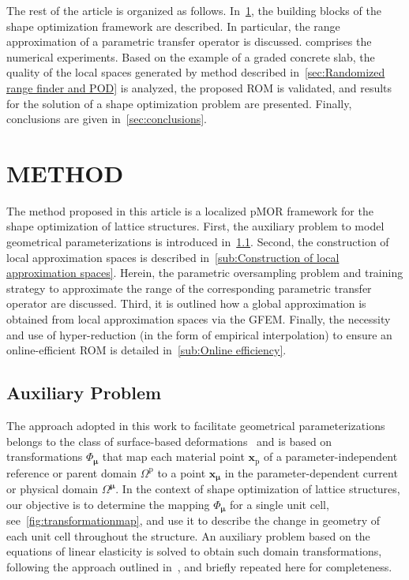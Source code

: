 \documentclass[a4paper]{eccomas_paper-2024}
\begin{document}
The rest of the article is organized as follows.
In~\cref{sec:method}, the building blocks of the shape optimization framework are described.
In particular, the range approximation of a parametric transfer operator is discussed.
 comprises the numerical experiments.
Based on the example of a graded concrete slab, the quality of the local spaces generated by method described in~\cref{sec:Randomized range finder and POD} is analyzed, the proposed ROM is validated, and results for the solution of a shape optimization problem are presented.
Finally, conclusions are given in~\cref{sec:conclusions}.


\section{METHOD}%
\label{sec:method}
The method proposed in this article is a localized pMOR framework for the shape optimization of lattice structures.
First, the auxiliary problem to model geometrical parameterizations is introduced in~\cref{sub:Auxiliary Problem}.
Second, the construction of local approximation spaces is described in~\cref{sub:Construction of local approximation spaces}.
Herein, the parametric oversampling problem and training strategy to approximate the range of the corresponding parametric transfer operator are discussed.
Third, it is outlined how a global approximation is obtained from local approximation spaces via the GFEM.
Finally, the necessity and use of hyper-reduction (in the form of empirical interpolation) to ensure an online-efficient ROM is detailed in~\cref{sub:Online efficiency}.

\subsection{Auxiliary Problem} %
\label{sub:Auxiliary Problem}
The approach adopted in this work to facilitate geometrical parameterizations belongs to the class of surface-based deformations~\cite{Botsch2010Polygon} and is based on transformations $\Phi_{\bm\mu}$ that map each material point $\bm{x}_{\mathrm{p}}$ of a parameter-independent reference or parent domain $\varOmega^{\mathrm{p}}$ to a point $\bm{x}_{\bm\mu}$ in the parameter-dependent current or physical domain $\varOmega^{\bm\mu}$.
In the context of shape optimization of lattice structures, our objective is to determine the mapping $\Phi_{\bm\mu}$ for a single unit cell, see~\cref{fig:transformationmap}, and use it to describe the change in geometry of each unit cell throughout the structure.
An auxiliary problem based on the equations of linear elasticity is solved to obtain such domain transformations, following the approach outlined in~\cite{Guo2022Learning}, and briefly repeated here for completeness.
\end{document}
